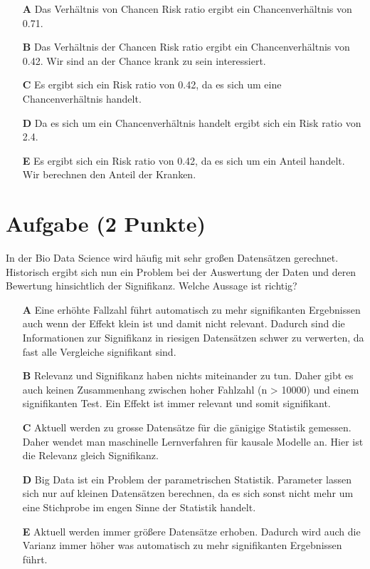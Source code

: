 \documentclass[a4paper, 9pt]{scrartcl}\usepackage[]{graphicx}\usepackage[]{xcolor}
\begin{document}
\begin{enumerate}
\item [\textbf{A} \msquare] Das Verhältnis von Chancen Risk ratio ergibt ein Chancenverhältnis von 0.71.
\item [\textbf{B} \msquare] Das Verhältnis der Chancen Risk ratio ergibt ein Chancenverhältnis von 0.42. Wir sind an der Chance krank zu sein interessiert.
\item [\textbf{C} \msquare] Es ergibt sich ein Risk ratio von 0.42, da es sich um eine Chancenverhältnis handelt.
\item [\textbf{D} \msquare] Da es sich um ein Chancenverhältnis handelt ergibt sich ein Risk ratio von 2.4.
\item [\textbf{E} \msquare] Es ergibt sich ein Risk ratio von 0.42, da es sich um ein Anteil handelt. Wir berechnen den Anteil der Kranken.
\end{enumerate}

\section{Aufgabe \hfill (2 Punkte)}



In der Bio Data Science wird häufig mit sehr großen Datensätzen gerechnet. Historisch ergibt sich nun ein Problem bei der Auswertung der Daten und deren Bewertung hinsichtlich der Signifikanz. Welche Aussage ist richtig?





\begin{enumerate}
\item [\textbf{A} \msquare] Eine erhöhte Fallzahl führt automatisch zu mehr signifikanten Ergebnissen auch wenn der Effekt klein ist und damit nicht relevant. Dadurch sind die Informationen zur Signifikanz in riesigen Datensätzen schwer zu verwerten, da fast alle Vergleiche signifikant sind.
\item [\textbf{B} \msquare] Relevanz und Signifikanz haben nichts miteinander zu tun. Daher gibt es auch keinen Zusammenhang zwischen hoher Fahlzahl (n > 10000) und einem signifikanten Test. Ein Effekt ist immer relevant und somit signifikant.
\item [\textbf{C} \msquare] Aktuell werden zu grosse Datensätze für die gänigige Statistik gemessen. Daher wendet man maschinelle Lernverfahren für kausale Modelle an. Hier ist die Relevanz gleich Signifikanz.
\item [\textbf{D} \msquare] Big Data ist ein Problem der parametrischen Statistik. Parameter lassen sich nur auf kleinen Datensätzen berechnen, da es sich sonst nicht mehr um eine Stichprobe im engen Sinne der Statistik handelt.
\item [\textbf{E} \msquare] Aktuell werden immer größere Datensätze erhoben. Dadurch wird auch die Varianz immer höher was automatisch zu mehr signifikanten Ergebnissen führt.
\end{enumerate}
\end{document}
